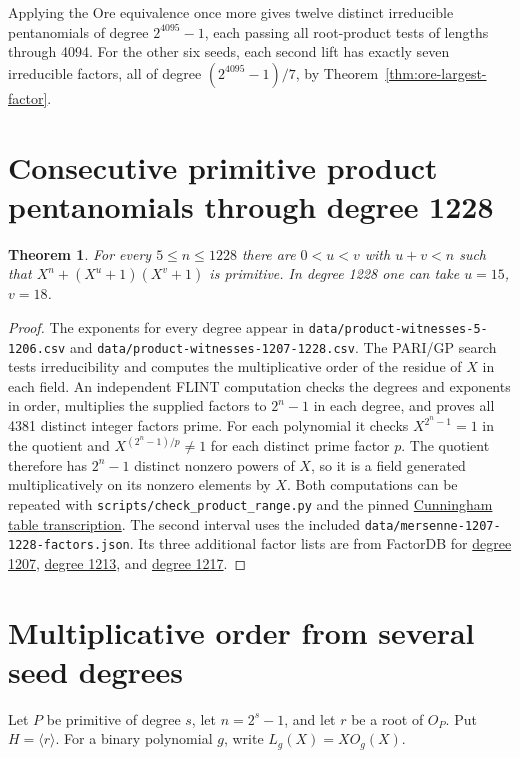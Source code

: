 \documentclass[11pt]{article}
\newtheorem{theorem}{Theorem}
\begin{document}
Applying the Ore equivalence once more gives twelve distinct
irreducible pentanomials of degree \(2^{4095}-1\), each passing all
root-product tests of lengths through 4094. For the other six seeds,
each second lift has exactly seven irreducible factors, all of degree
\((2^{4095}-1)/7\), by Theorem~\ref{thm:ore-largest-factor}.

\section{Consecutive primitive product pentanomials through degree 1228}
\begin{theorem}
For every \(5\le n\le1228\) there are \(0<u<v\) with \(u+v<n\)
such that \(X^n+(X^u+1)(X^v+1)\) is primitive.
In degree 1228 one can take \(u=15\), \(v=18\).
\end{theorem}
\begin{proof}
The exponents for every degree appear in
\nolinkurl{data/product-witnesses-5-1206.csv} and
\nolinkurl{data/product-witnesses-1207-1228.csv}. The PARI/GP search
tests irreducibility and computes the multiplicative order of the
residue of \(X\) in each field. An independent FLINT computation
checks the degrees and exponents in order, multiplies the supplied
factors to \(2^n-1\) in each degree, and proves all 4381 distinct
integer factors prime. For each polynomial it checks \(X^{2^n-1}=1\)
in the quotient and \(X^{(2^n-1)/p}\ne1\) for each distinct prime
factor \(p\). The quotient therefore has \(2^n-1\) distinct nonzero
powers of \(X\), so it is a field generated multiplicatively on its
nonzero elements by \(X\). Both computations can be repeated with
\nolinkurl{scripts/check_product_range.py} and the pinned
\href{https://github.com/postvakje/Reformatted-Cunningham-Project-tables/blob/dff2e282ff15399b16b4fb840a410aa2a37076b7/pmain422_table2-.json}
{Cunningham table transcription}. The second interval uses the included
\nolinkurl{data/mersenne-1207-1228-factors.json}. Its three additional
factor lists are from FactorDB for
\href{https://factordb.com/index.php?id=1000000000000001207}{degree 1207},
\href{https://factordb.com/index.php?id=1000000000000001213}{degree 1213}, and
\href{https://factordb.com/index.php?id=1000000000000001217}{degree 1217}.
\end{proof}

\section{Multiplicative order from several seed degrees}\label{sec:mixed-order}
Let \(P\) be primitive of degree \(s\), let \(n=2^s-1\), and let
\(r\) be a root of \(O_P\). Put \(H=\langle r\rangle\).
For a binary polynomial \(g\), write \(L_g(X)=X O_g(X)\).
\end{document}
